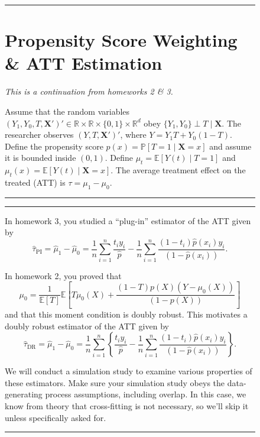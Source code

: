 \documentclass{article}
\newenvironment{colorparagraph}[1]{\par\color{#1}}{\par}
\begin{document}
\begin{figure}[H]
  \begin{colorparagraph}{questioncolor}
  \rule{\textwidth}{0.5pt}
  \label{q2}
  \section{Propensity Score Weighting \& ATT Estimation}

  \textit{This is a continuation from homeworks 2 \& 3.}

  Assume that the random variables \( (Y_1, Y_0, T, \mathbf{X}')' \in \mathbb{R} \times \mathbb{R} \times \{0, 1\} \times \mathbb{R}^d \) obey \( \{Y_1, Y_0\} \perp T \mid \mathbf{X} \). The researcher observes \( (Y, T, \mathbf{X}')' \), where \( Y = Y_1 T + Y_0 (1 - T) \). Define the propensity score \( p(x) = \mathbb{P}[T = 1 \mid \mathbf{X} = x] \) and assume it is bounded inside \( (0, 1) \). Define \( \mu_t = \mathbb{E}[Y(t) \mid T = 1] \) and \( \mu_t(x) = \mathbb{E}[Y(t) \mid \mathbf{X} = x] \). The average treatment effect on the treated (ATT) is \( \tau = \mu_1 - \mu_0 \).

  \rule{\textwidth}{0.5pt}
  \end{colorparagraph}
\end{figure}

\begin{figure}[H]
  \begin{colorparagraph}{questioncolor}
  \rule{\textwidth}{0.5pt}

  In homework 3, you studied a “plug-in” estimator of the ATT given by
  \[
  \hat{\tau}_{\text{PI}} = \hat{\mu}_1 - \hat{\mu}_0 = \frac{1}{n} \sum_{i=1}^n \frac{t_i y_i}{\hat{p}} - \frac{1}{n} \sum_{i=1}^n \frac{(1 - t_i) \hat{p}(x_i) y_i}{(1 - \hat{p}(x_i))}.
  \]

  In homework 2, you proved that
  \[
  \mu_0 = \frac{1}{\mathbb{E}[T]} \mathbb{E}\left[ T \mu_0(X) + \frac{(1 - T) p(X) (Y - \mu_0(X))}{(1 - p(X))} \right]
  \]
  and that this moment condition is doubly robust. This motivates a doubly robust estimator of the ATT given by
  \[
  \hat{\tau}_{\text{DR}} = \hat{\mu}_1 - \hat{\mu}_0 = \frac{1}{n} \sum_{i=1}^n \left\{ \frac{t_i y_i}{\hat{p}} - \frac{1}{n} \sum_{i=1}^n \frac{(1 - t_i) \hat{p}(x_i) y_i}{(1 - \hat{p}(x_i))} \right\}.
  \]

  We will conduct a simulation study to examine various properties of these estimators. Make sure your simulation study obeys the data-generating process assumptions, including overlap. In this case, we know from theory that cross-fitting is not necessary, so we’ll skip it unless specifically asked for.

  \rule{\textwidth}{0.5pt}
  \end{colorparagraph}
\end{figure}
\end{document}
